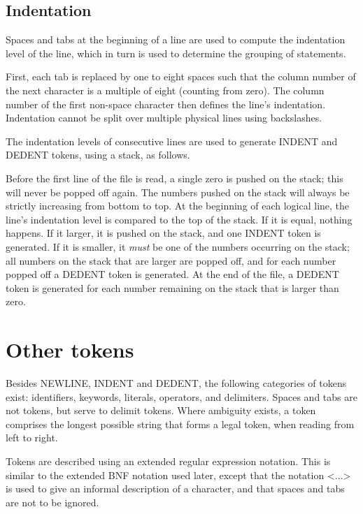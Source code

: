 \subsection{Indentation}

Spaces and tabs at the beginning of a line are used to compute
the indentation level of the line, which in turn is used to determine
the grouping of statements.

First, each tab is replaced by one to eight spaces such that the column number
of the next character is a multiple of eight (counting from zero).
The column number of the first non-space character then defines the
line's indentation.
Indentation cannot be split over multiple physical lines using
backslashes.

The indentation levels of consecutive lines are used to generate
INDENT and DEDENT tokens, using a stack, as follows.

Before the first line of the file is read, a single zero is pushed on
the stack; this will never be popped off again.  The numbers pushed
on the stack will always be strictly increasing from bottom to top.
At the beginning of each logical line, the line's indentation level
is compared to the top of the stack.
If it is equal, nothing happens.
If it larger, it is pushed on the stack, and one INDENT token is generated.
If it is smaller, it {\em must} be one of the numbers occurring on the
stack; all numbers on the stack that are larger are popped off,
and for each number popped off a DEDENT token is generated.
At the end of the file, a DEDENT token is generated for each number
remaining on the stack that is larger than zero.

\section{Other tokens}

Besides NEWLINE, INDENT and DEDENT, the following categories of tokens
exist: identifiers, keywords, literals, operators, and delimiters.
Spaces and tabs are not tokens, but serve to delimit tokens.
Where ambiguity exists, a token comprises the longest possible
string that forms a legal token, when reading from left to right.

Tokens are described using an extended regular expression notation.
This is similar to the extended BNF notation used later, except that
the notation <...> is used to give an informal description of a character,
and that spaces and tabs are not to be ignored.

